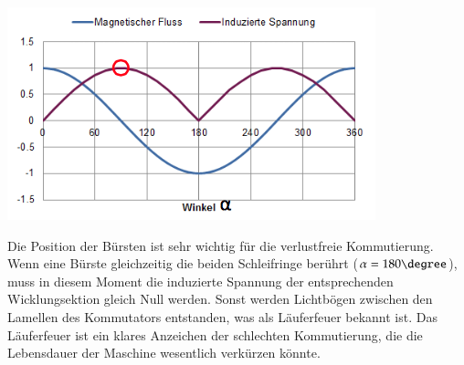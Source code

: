 \begin{minipage}{0.4 \linewidth}
\includegraphics[width = \linewidth]{./Pics/VL45/GSM3}
\end{minipage}
\begin{minipage}{0.6\linewidth}
Die Position der Bürsten ist sehr wichtig für die verlustfreie Kommutierung. Wenn eine Bürste gleichzeitig die beiden Schleifringe berührt ($\alpha = 180\degree$), muss in diesem Moment die induzierte Spannung der entsprechenden Wicklungsektion gleich Null werden. Sonst werden Lichtbögen zwischen den Lamellen des Kommutators entstanden, was als Läuferfeuer bekannt ist. Das Läuferfeuer ist ein klares Anzeichen der schlechten Kommutierung, die die Lebensdauer der Maschine wesentlich verkürzen könnte.
\end{minipage}

